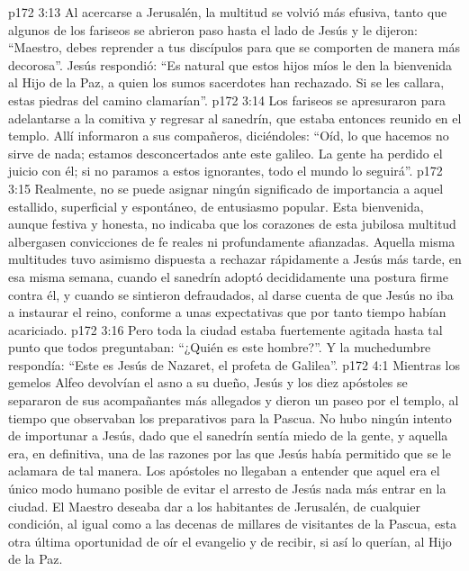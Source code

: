 \vs p172 3:13 Al acercarse a Jerusalén, la multitud se volvió más efusiva, tanto que algunos de los fariseos se abrieron paso hasta el lado de Jesús y le dijeron: “Maestro, debes reprender a tus discípulos para que se comporten de manera más decorosa”. Jesús respondió: “Es natural que estos hijos míos le den la bienvenida al Hijo de la Paz, a quien los sumos sacerdotes han rechazado. Si se les callara, estas piedras del camino clamarían”.
\vs p172 3:14 Los fariseos se apresuraron para adelantarse a la comitiva y regresar al sanedrín, que estaba entonces reunido en el templo. Allí informaron a sus compañeros, diciéndoles: “Oíd, lo que hacemos no sirve de nada; estamos desconcertados ante este galileo. La gente ha perdido el juicio con él; si no paramos a estos ignorantes, todo el mundo lo seguirá”.
\vs p172 3:15 Realmente, no se puede asignar ningún significado de importancia a aquel estallido, superficial y espontáneo, de entusiasmo popular. Esta bienvenida, aunque festiva y honesta, no indicaba que los corazones de esta jubilosa multitud albergasen convicciones de fe reales ni profundamente afianzadas. Aquella misma multitudes tuvo asimismo dispuesta a rechazar rápidamente a Jesús más tarde, en esa misma semana, cuando el sanedrín adoptó decididamente una postura firme contra él, y cuando se sintieron defraudados, al darse cuenta de que Jesús no iba a instaurar el reino, conforme a unas expectativas que por tanto tiempo habían acariciado.
\vs p172 3:16 Pero toda la ciudad estaba fuertemente agitada hasta tal punto que todos preguntaban: “¿Quién es este hombre?”. Y la muchedumbre respondía: “Este es Jesús de Nazaret, el profeta de Galilea”.
\vs p172 4:1 Mientras los gemelos Alfeo devolvían el asno a su dueño, Jesús y los diez apóstoles se separaron de sus acompañantes más allegados y dieron un paseo por el templo, al tiempo que observaban los preparativos para la Pascua. No hubo ningún intento de importunar a Jesús, dado que el sanedrín sentía miedo de la gente, y aquella era, en definitiva, una de las razones por las que Jesús había permitido que se le aclamara de tal manera. Los apóstoles no llegaban a entender que aquel era el único modo humano posible de evitar el arresto de Jesús nada más entrar en la ciudad. El Maestro deseaba dar a los habitantes de Jerusalén, de cualquier condición, al igual como a las decenas de millares de visitantes de la Pascua, esta otra última oportunidad de oír el evangelio y de recibir, si así lo querían, al Hijo de la Paz.
